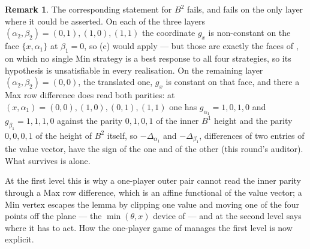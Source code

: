 \documentclass[11pt]{article}
\theoremstyle{plain}
\theoremstyle{definition}
\newtheorem{remark}[theorem]{Remark}
\begin{document}
\begin{remark}\label{rem:parity-b2}
The corresponding statement for $B^{2}$ fails, and fails on the only
layer where it could be asserted. On each of the three layers
$(\alpha_2,\beta_2)=(0,1),(1,0),(1,1)$ the coordinate $g_x$ is
non-constant on the face $\{x,\alpha_1\}$ at $\beta_1=0$, so
(c) would apply --- but those are exactly the faces of
, on which no single Min strategy is a best response to
all four strategies, so its hypothesis is unsatisfiable in every
realisation. On the remaining layer $(\alpha_2,\beta_2)=(0,0)$, the
translated one, $g_x$ is constant on that face, and there a Max row
difference does read both parities: at
$(x,\alpha_1)=(0,0),(1,0),(0,1),(1,1)$ one has $g_{\alpha_1}=1,0,1,0$ and
$g_{\beta_1}=1,1,1,0$ against the parity $0,1,0,1$ of the inner $B^{1}$
height and the parity $0,0,0,1$ of the height of $B^{2}$ itself, so
$-\Delta_{\alpha_1}$ and $-\Delta_{\beta_1}$, differences of two entries
of the value vector, have the sign of the one and of the other (this
round's auditor). What survives is  alone.
\end{remark}

At the first level this is why a one-player outer pair cannot read the
inner parity through a Max row difference, which is an affine functional
of the value vector; a Min vertex escapes the lemma by clipping one value
and moving one of the four points off the plane --- the $\min(\theta,x)$
device of  --- and at the second level
 says where it has to act. How the one-player
game of  manages the first level is now
explicit.
\end{document}
